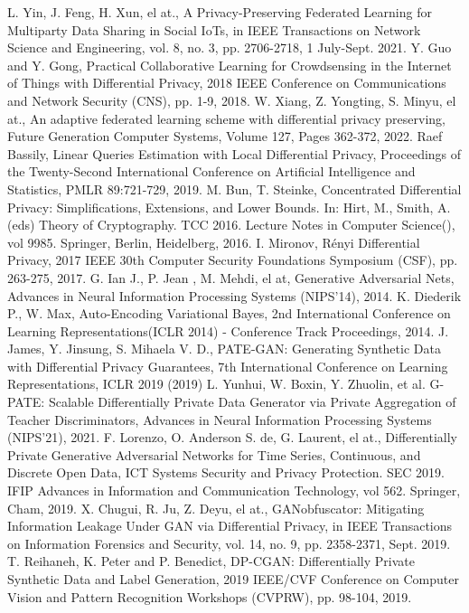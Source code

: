 \documentclass[conference]{IEEEtran}
\begin{document}
\begin{thebibliography}{00}
 L. Yin, J. Feng, H. Xun, el at., A Privacy-Preserving Federated Learning for Multiparty Data Sharing in Social IoTs, in IEEE Transactions on Network Science and Engineering, vol. 8, no. 3, pp. 2706-2718, 1 July-Sept. 2021.
 Y. Guo and Y. Gong, Practical Collaborative Learning for Crowdsensing in the Internet of Things with Differential Privacy, 2018 IEEE Conference on Communications and Network Security (CNS), pp. 1-9, 2018.
 W. Xiang, Z. Yongting, S. Minyu, el at., An adaptive federated learning scheme with differential privacy preserving, Future Generation Computer Systems, Volume 127, Pages 362-372, 2022.
 Raef Bassily, Linear Queries Estimation with Local Differential Privacy, Proceedings of the Twenty-Second International Conference on Artificial Intelligence and Statistics, PMLR 89:721-729, 2019.
 M. Bun, T. Steinke, Concentrated Differential Privacy: Simplifications, Extensions, and Lower Bounds. In: Hirt, M., Smith, A. (eds) Theory of Cryptography. TCC 2016. Lecture Notes in Computer Science(), vol 9985. Springer, Berlin, Heidelberg, 2016.
I. Mironov, Rényi Differential Privacy, 2017 IEEE 30th Computer Security Foundations Symposium (CSF), pp. 263-275, 2017.
G. Ian J., P. Jean , M. Mehdi, el at, Generative Adversarial Nets, Advances in Neural Information Processing Systems (NIPS'14), 2014.
 K. Diederik P., W. Max, Auto-Encoding Variational Bayes, 2nd International Conference on Learning Representations(ICLR 2014) - Conference Track Proceedings, 2014.
 J. James, Y. Jinsung, S. Mihaela V. D., PATE-GAN: Generating Synthetic Data with Differential Privacy Guarantees, 7th International Conference on Learning Representations, ICLR 2019 (2019)
 L. Yunhui, W. Boxin, Y. Zhuolin, et al. G-PATE: Scalable Differentially Private Data Generator via Private Aggregation of Teacher Discriminators, Advances in Neural Information Processing Systems (NIPS'21), 2021.
 F. Lorenzo, O. Anderson S. de, G. Laurent, el at., Differentially Private Generative Adversarial Networks for Time Series, Continuous, and Discrete Open Data, ICT Systems Security and Privacy Protection. SEC 2019. IFIP Advances in Information and Communication Technology, vol 562. Springer, Cham, 2019.
X. Chugui, R. Ju, Z. Deyu, el at., GANobfuscator: Mitigating Information Leakage Under GAN via Differential Privacy, in IEEE Transactions on Information Forensics and Security, vol. 14, no. 9, pp. 2358-2371, Sept. 2019.
 T. Reihaneh,  K. Peter and P. Benedict, DP-CGAN: Differentially Private Synthetic Data and Label Generation, 2019 IEEE/CVF Conference on Computer Vision and Pattern Recognition Workshops (CVPRW),  pp. 98-104, 2019.

\end{thebibliography}
\end{document}
